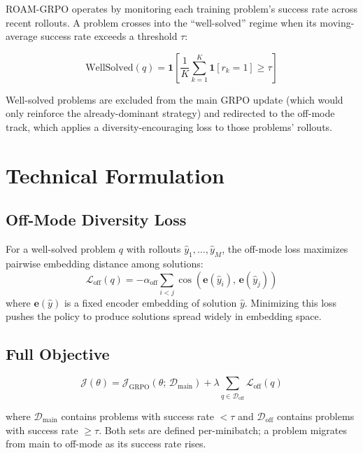 \documentclass[10pt,twocolumn]{article}
\begin{document}
ROAM-GRPO operates by monitoring each training problem's success rate across recent rollouts.
A problem crosses into the ``well-solved'' regime when its moving-average success rate exceeds a threshold $\tau$:

\begin{equation}
\text{WellSolved}(q) = \mathbf{1}\!\left[\frac{1}{K}\sum_{k=1}^{K} \mathbf{1}[r_k = 1] \geq \tau\right]
\label{eq:ws}
\end{equation}

Well-solved problems are excluded from the main GRPO update (which would only reinforce the already-dominant strategy) and redirected to the off-mode track, which applies a diversity-encouraging loss to those problems' rollouts.

\section{Technical Formulation}

\subsection*{Off-Mode Diversity Loss}

For a well-solved problem $q$ with rollouts $\hat{y}_1, \ldots, \hat{y}_M$, the off-mode loss maximizes pairwise embedding distance among solutions:
\begin{equation}
\mathcal{L}_{\mathrm{off}}(q) = -\alpha_{\mathrm{off}} \sum_{i < j} \cos\!\left(\mathbf{e}(\hat{y}_i),\, \mathbf{e}(\hat{y}_j)\right)
\label{eq:off}
\end{equation}
where $\mathbf{e}(\hat{y})$ is a fixed encoder embedding of solution $\hat{y}$.
Minimizing this loss pushes the policy to produce solutions spread widely in embedding space.

\subsection*{Full Objective}

\begin{equation}
\mathcal{J}(\theta) = \mathcal{J}_{\mathrm{GRPO}}(\theta;\, \mathcal{D}_{\mathrm{main}}) + \lambda \sum_{q \in \mathcal{D}_{\mathrm{off}}} \mathcal{L}_{\mathrm{off}}(q)
\label{eq:full}
\end{equation}

where $\mathcal{D}_{\mathrm{main}}$ contains problems with success rate $< \tau$ and $\mathcal{D}_{\mathrm{off}}$ contains problems with success rate $\geq \tau$.
Both sets are defined per-minibatch; a problem migrates from main to off-mode as its success rate rises.
\end{document}
